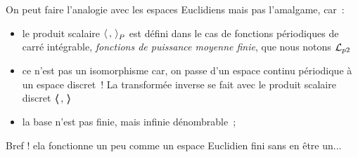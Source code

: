 
 On peut faire l'analogie avec les espaces Euclidiens mais pas l'amalgame, car~:
 \begin{itemize}
   \item le produit scalaire $\langle\,,\,{\rangle}_P$ est défini dans le cas de fonctions périodiques de carré intégrable, \emph{fonctions de puissance moyenne finie},  que nous notons $\mathcal{L}_{p 2}$
 \item ce n'est pas un isomorphisme car, on passe d'un espace continu périodique à
   un espace discret~! La transformée inverse se fait avec le produit scalaire discret $\langle\!\!\langle\,,\,\rangle\!\!\rangle$
\item la base n'est pas finie, mais infinie dénombrable~;
\end{itemize}

Bref ! ela fonctionne un peu comme un espace Euclidien fini sans en être un...

